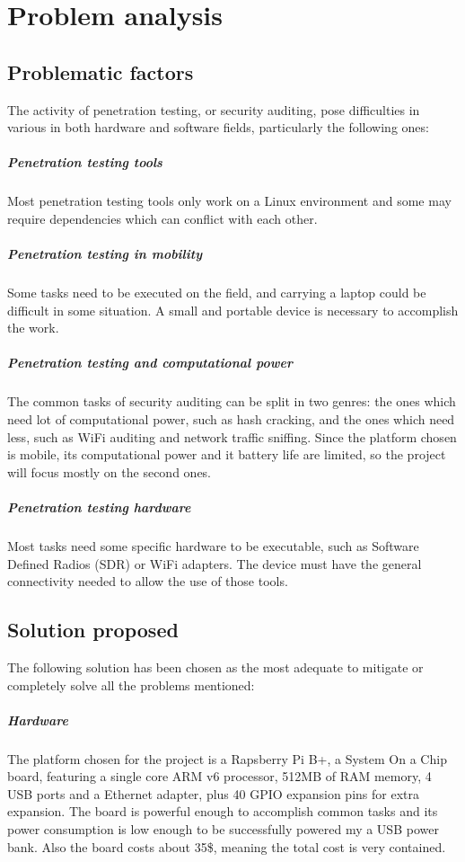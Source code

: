 \documentclass[../PiTest.tex]{subfiles}
\begin{document}
\section{Problem analysis}

    \subsection{Problematic factors}

    The activity of penetration testing, or security auditing, pose difficulties in various in both hardware and software fields, particularly the following ones:

    \subparagraph{Penetration testing tools}
        Most penetration testing tools only work on a Linux environment and some may require dependencies which can conflict with each other.    

	\subparagraph{Penetration testing in mobility}
        Some tasks need to be executed on the field, and carrying a laptop could be difficult in some situation.
        A small and portable device is necessary to accomplish the work.

    \subparagraph{Penetration testing and computational power}
        The common tasks of security auditing can be split in two genres: the ones which need lot of computational power, such as hash cracking, and the ones which need less, such as WiFi auditing and network traffic sniffing.
        Since the platform chosen is mobile, its computational power and it battery life are limited, so the project will focus mostly on the second ones. 
	
    \subparagraph{Penetration testing hardware}
        Most tasks need some specific hardware to be executable, such as Software Defined Radios (SDR) or WiFi adapters. The device must have the general connectivity needed to allow the use of those tools.


	\subsection{Solution proposed}
        The following solution has been chosen as the most adequate to mitigate or completely solve all the problems mentioned:
        
        \subparagraph{Hardware}
            The platform chosen for the project is a Rapsberry Pi B+, a System On a Chip board, featuring a single core ARM v6 processor, 512MB of RAM memory, 4 USB ports and a Ethernet adapter, plus 40 GPIO expansion pins for extra expansion. The board is powerful enough to accomplish common tasks and its power consumption is low enough to be successfully powered my a USB power bank. Also the board costs about 35\$, meaning the total cost is very contained.
        
\end{document}
